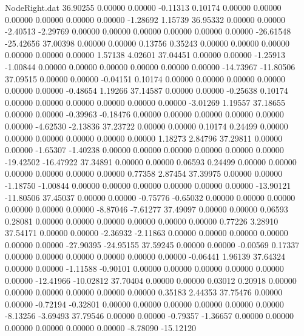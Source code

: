 \begin{filecontents}{NodeRight.dat}
  36.90255    0.00000    0.00000    -0.11313    0.10174    0.00000    0.00000    0.00000    0.00000    0.00000    0.00000   -1.28692    1.15739
  36.95332    0.00000    0.00000    -2.40513   -2.29769    0.00000    0.00000    0.00000    0.00000    0.00000    0.00000  -26.61548  -25.42656
  37.00398    0.00000    0.00000     0.13756    0.35243    0.00000    0.00000    0.00000    0.00000    0.00000    0.00000    1.57138    4.02601
  37.04451    0.00000    0.00000    -1.25913   -1.00844    0.00000    0.00000    0.00000    0.00000    0.00000    0.00000  -14.73967  -11.80506
  37.09515    0.00000    0.00000    -0.04151    0.10174    0.00000    0.00000    0.00000    0.00000    0.00000    0.00000   -0.48654    1.19266
  37.14587    0.00000    0.00000    -0.25638    0.10174    0.00000    0.00000    0.00000    0.00000    0.00000    0.00000   -3.01269    1.19557
  37.18655    0.00000    0.00000    -0.39963   -0.18476    0.00000    0.00000    0.00000    0.00000    0.00000    0.00000   -4.62530   -2.13836
  37.23722    0.00000    0.00000     0.10174    0.24499    0.00000    0.00000    0.00000    0.00000    0.00000    0.00000    1.18273    2.84796
  37.29811    0.00000    0.00000    -1.65307   -1.40238    0.00000    0.00000    0.00000    0.00000    0.00000    0.00000  -19.42502  -16.47922
  37.34891    0.00000    0.00000     0.06593    0.24499    0.00000    0.00000    0.00000    0.00000    0.00000    0.00000    0.77358    2.87454
  37.39975    0.00000    0.00000    -1.18750   -1.00844    0.00000    0.00000    0.00000    0.00000    0.00000    0.00000  -13.90121  -11.80506
  37.45037    0.00000    0.00000    -0.75776   -0.65032    0.00000    0.00000    0.00000    0.00000    0.00000    0.00000   -8.87046   -7.61277
  37.49097    0.00000    0.00000     0.06593    0.28081    0.00000    0.00000    0.00000    0.00000    0.00000    0.00000    0.77226    3.28910
  37.54171    0.00000    0.00000    -2.36932   -2.11863    0.00000    0.00000    0.00000    0.00000    0.00000    0.00000  -27.90395  -24.95155
  37.59245    0.00000    0.00000    -0.00569    0.17337    0.00000    0.00000    0.00000    0.00000    0.00000    0.00000   -0.06441    1.96139
  37.64324    0.00000    0.00000    -1.11588   -0.90101    0.00000    0.00000    0.00000    0.00000    0.00000    0.00000  -12.41966  -10.02812
  37.70404    0.00000    0.00000     0.03012    0.20918    0.00000    0.00000    0.00000    0.00000    0.00000    0.00000    0.35183    2.44353
  37.75476    0.00000    0.00000    -0.72194   -0.32801    0.00000    0.00000    0.00000    0.00000    0.00000    0.00000   -8.13256   -3.69493
  37.79546    0.00000    0.00000    -0.79357   -1.36657    0.00000    0.00000    0.00000    0.00000    0.00000    0.00000   -8.78090  -15.12120

\end{filecontents}
